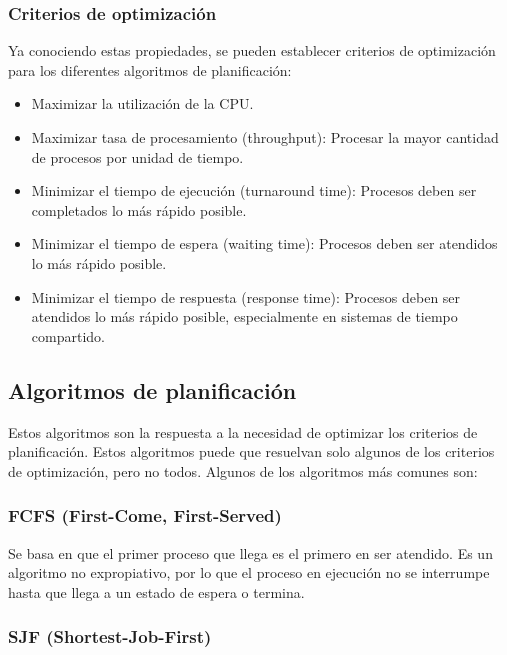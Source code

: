\documentclass{templateNote}
\begin{document}
\subsubsection*{Criterios de optimización}
Ya conociendo estas propiedades, se pueden establecer criterios de optimización para los diferentes algoritmos de planificación:
\begin{itemize}
    \item Maximizar la utilización de la CPU.
    \item Maximizar tasa de procesamiento (throughput): Procesar la mayor cantidad de procesos por unidad de tiempo.
    \item Minimizar el tiempo de ejecución (turnaround time): Procesos deben ser completados lo más rápido posible.
    \item Minimizar el tiempo de espera (waiting time): Procesos deben ser atendidos lo más rápido posible.
    \item Minimizar el tiempo de respuesta (response time): Procesos deben ser atendidos lo más rápido posible, especialmente en sistemas de tiempo compartido.
\end{itemize}

\subsection*{Algoritmos de planificación}
Estos algoritmos son la respuesta a la necesidad de optimizar los criterios de planificación. Estos algoritmos puede que resuelvan solo algunos de los criterios de optimización, pero no todos. Algunos de los algoritmos más comunes son:

\subsubsection*{FCFS (First-Come, First-Served)}

Se basa en que el primer proceso que llega es el primero en ser atendido. Es un algoritmo no expropiativo, por lo que el proceso en ejecución no se interrumpe hasta que llega a un estado de espera o termina.

\subsubsection*{SJF (Shortest-Job-First)}
\end{document}
